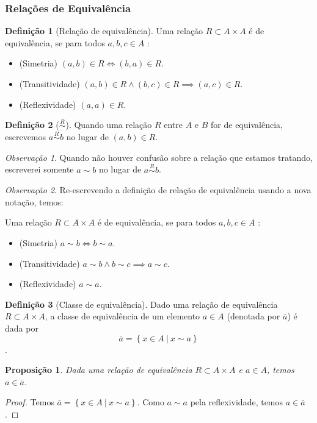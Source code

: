 \documentclass{article}
\theoremstyle{plain}
\newtheorem{prop}{Proposição}[section]
\theoremstyle{definition}
\newtheorem{definicao}{Definição}[section]
\theoremstyle{remark}
\newtheorem{obs}{Observação}[section]
\begin{document}
\subsubsection{Relações de Equivalência}
\begin{definicao}[Relação de equivalência]
	Uma relação $R \subset A \times A$ é de equivalência, se para todos $a,b,c \in A$ :
	\begin{itemize}
		\item (Simetria) $(a,b) \in R \iff  (b,a)\in R$.
		\item (Transitividade)  $(a,b)\in R \land (b,c)\in R \implies (a,c) \in R$.
		\item  (Reflexividade) $(a,a) \in R$.
	\end{itemize}
\end{definicao}
\begin{definicao}[$\overset{R}{\sim}$]
	Quando uma relação $R$ entre $A$ e $B$ for de equivalência, escrevemos $a\overset{R}{\sim} b$ no lugar de $(a,b) \in R$.
\end{definicao}
\begin{obs}
	Quando não houver confusão sobre a relação que estamos tratando, escreverei somente $a\sim b$ no lugar de $a\overset{R}{\sim} b$. 
\end{obs}
\begin{obs}

	Re-escrevendo a definição de relação de equivalência usando a nova notação, temos:

	Uma relação $R \subset A \times A$ é de equivalência, se para todos $a,b,c \in A$ :
	\begin{itemize}
		\item (Simetria) $a\sim b \iff  b \sim a$.
		\item (Transitividade)  $a \sim b \land b \sim c \implies a \sim c$.
		\item  (Reflexividade) $a \sim a$.
	\end{itemize}
\end{obs}
\begin{definicao}[Classe de equivalência]
	Dado uma relação de equivalência $R\subset A\times A$, a classe de equivalência de um elemento  $a\in A$ (denotada por $\bar{a}$) é dada por $$ \bar{a} = \left\{ x\in A \: | \: x\sim a \right\}$$.
\end{definicao}
\begin{prop}
	Dada uma relação de equivalência $R\subset A \times A$ e $a\in A$, temos $a\in \bar{a}$. 
\end{prop}
\begin{proof}
	Temos $\bar{a} = \left\{ x\in A \: | \: x\sim a \right\}$. Como $a\sim a$ pela reflexividade, temos $a\in \bar{a}$.
\end{proof}
\end{document}
